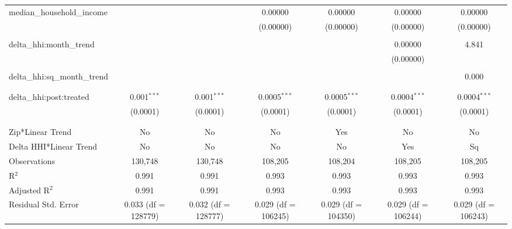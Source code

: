 \begin{table}[H]
{\begin{tabular}{@{\extracolsep{5pt}}lcccccc}
  median\_household\_income &  &  & 0.00000 & 0.00000 & 0.00000 & 0.00000 \\  

   &  &  & (0.00000) & (0.00000) & (0.00000) & (0.00000) \\  

   & & & & & & \\  

  delta\_hhi:month\_trend &  &  &  &  & 0.00000 & 4.841 \\  

   &  &  &  &  & (0.00000) &  \\  

   & & & & & & \\  

  delta\_hhi:sq\_month\_trend &  &  &  &  &  & 0.000 \\  

   &  &  &  &  &  &  \\  

   & & & & & & \\  

  delta\_hhi:post:treated & 0.001$^{***}$ & 0.001$^{***}$ & 0.0005$^{***}$ & 0.0005$^{***}$ & 0.0004$^{***}$ & 0.0004$^{***}$ \\  

   & (0.0001) & (0.0001) & (0.0001) & (0.0001) & (0.0001) & (0.0001) \\  

   & & & & & & \\  

 \hline \\[-1.8ex]  

 Zip*Linear Trend & No & No & No & Yes & No & No \\  

 Delta HHI*Linear Trend & No & No & No & No & Yes & Sq \\  

 Observations & 130,748 & 130,748 & 108,205 & 108,204 & 108,205 & 108,205 \\  

 R$^{2}$ & 0.991 & 0.991 & 0.993 & 0.993 & 0.993 & 0.993 \\  

 Adjusted R$^{2}$ & 0.991 & 0.991 & 0.993 & 0.993 & 0.993 & 0.993 \\  

 Residual Std. Error & 0.033 (df = 128779) & 0.032 (df = 128777) & 0.029 (df = 106245) & 0.029 (df = 104350) & 0.029 (df = 106244) & 0.029 (df = 106243) \\  


\end{tabular}}
\end{table}
